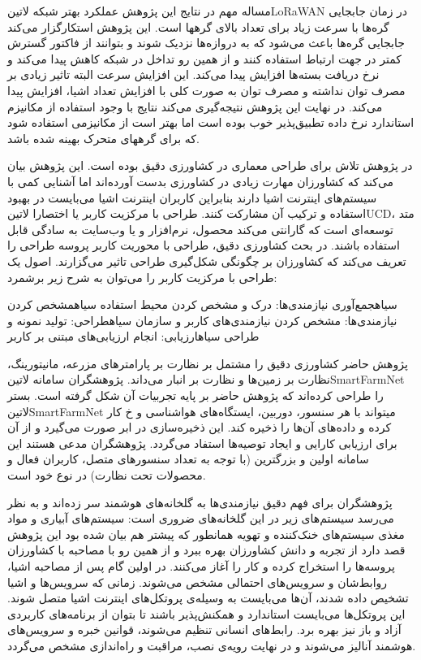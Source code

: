 مساله مهم در نتایج این پژوهش عملکرد بهتر شبکه ‌لاتین{LoRaWAN} در زمان جابجایی گره‌ها با سرعت زیاد برای تعداد بالای گرهها است.
این پژوهش استکارگزار می‌کند جابجایی گره‌ها باعث می‌شود که به دروازه‌ها نزدیک شوند و بتوانند از فاکتور گسترش
کمتر در جهت ارتباط استفاده کنند و از همین رو تداخل در شبکه کاهش پیدا می‌کند و نرخ دریافت بسته‌ها افزایش پیدا می‌کند.
این افزایش سرعت البته تاثیر زیادی بر مصرف توان نداشته و مصرف توان به صورت کلی با افزایش تعداد اشیا، افزایش پیدا می‌کند.
در نهایت این پژوهش نتیجه‌گیری می‌کند نتایج با وجود استفاده از مکانیزم استاندارد نرخ داده تطبیق‌پذیر خوب بوده است اما
بهتر است از مکانیزمی استفاده شود که برای گرههای متحرک بهینه شده باشد.



در پژوهش  تلاش برای طراحی معماری در کشاورزی دقیق بوده است. این پژوهش بیان می‌کند که کشاورزان مهارت زیادی در کشاورزی بدست آورده‌اند اما آشنایی کمی با سیستم‌های اینترنت اشیا دارند
بنابراین کاربران اینترنت اشیا می‌بایست در بهبود استفاده و ترکیب آن مشارکت کنند. طراحی با مرکزیت کاربر یا اختصارا ‌لاتین{UCD}، متد توسعه‌ای است که گارانتی می‌کند محصول، نرم‌افزار و یا وب‌سایت به سادگی قابل استفاده باشند.
در بحث کشاورزی دقیق، طراحی با محوریت کاربر پروسه طراحی را تعریف می‌کند که کشاورزان بر چگونگی شکل‌گیری طراحی تاثیر می‌گزارند. اصول یک طراحی با مرکزیت کاربر را می‌توان به شرح زیر برشمرد:

 ‌سیاه{جمع‌آوری نیازمندی‌ها}: درک و مشخص کردن محیط استفاده
 ‌سیاه{مشخص کردن نیازمندی‌ها}: مشخص کردن نیازمندی‌های کاربر و سازمان
 ‌سیاه{طراحی}: تولید نمونه و طراحی
 ‌سیاه{ارزیابی}: انجام ارزیابی‌های مبتنی بر کاربر

پژوهش حاضر کشاورزی دقیق را مشتمل بر نظارت بر پارامترهای مزرعه، مانیتورینگ، نظارت بر زمین‌ها و نظارت بر انبار می‌داند. پژوهشگران سامانه ‌لاتین{SmartFarmNet} را طراحی کرده‌اند که پژوهش حاضر بر پایه تجربیات آن شکل گرفته است.
بستر ‌لاتین{SmartFarmNet} میتواند با هر سنسور، دوربین، ایستگاه‌های هواشناسی و ‌خ کار کرده و داده‌های آن‌ها را ذخیره کند.
این ذخیره‌سازی در ابر صورت می‌گیرد و از آن برای ارزیابی کارایی و ایجاد توصیه‌ها استفاد می‌گردد.
پژوهشگران مدعی هستند این سامانه اولین و بزرگترین (با توجه به تعداد سنسورهای متصل، کاربران فعال و محصولات تحت نظارت) در نوع خود است.

پژوهشگران برای فهم دقیق نیازمندی‌ها به گلخانه‌های هوشمند سر زده‌اند و به نظر می‌رسد سیستم‌های زیر در این گلخانه‌های ضروری است:
 سیستم‌های آبیاری و مواد مغذی
 سیستم‌های خنک‌کننده و تهویه
همانطور که پیشتر هم بیان شده بود این پژوهش قصد دارد از تجربه و دانش کشاورزان بهره ببرد و از همین رو با مصاحبه با کشاورزان پروسه‌ها را استخراج کرده و کار را آغاز می‌کنند.
در اولین گام پس از مصاحبه اشیا، روابط‌شان و سرویس‌های احتمالی مشخص می‌شوند. زمانی که سرویس‌ها و اشیا تشخیص داده شدند، آن‌ها می‌بایست به وسیله‌ی پروتکل‌های اینترنت اشیا متصل شوند.
این پروتکل‌ها می‌بایست استاندارد و همکنش‌پذیر باشند تا بتوان از برنامه‌های کاربردی آزاد و باز نیز بهره برد.
رابط‌های انسانی تنظیم می‌شوند،
قوانین خبره و سرویس‌های هوشمند آنالیز می‌شوند و در نهایت رویه‌ی نصب، مراقبت و راه‌اندازی مشخص می‌گردد.

